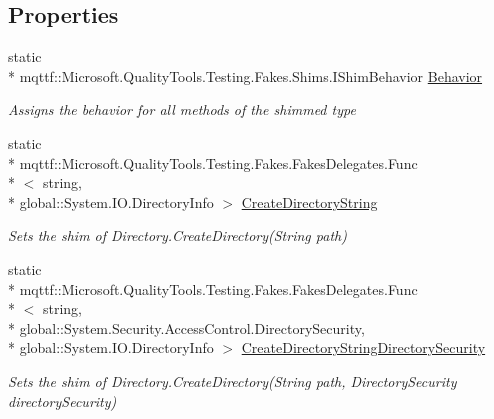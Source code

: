 \subsection*{Properties}
\begin{DoxyCompactItemize}
\item 
static \\*
mqttf\-::\-Microsoft.\-Quality\-Tools.\-Testing.\-Fakes.\-Shims.\-I\-Shim\-Behavior \hyperlink{class_system_1_1_i_o_1_1_fakes_1_1_shim_directory_a23cf83f8dd6e2bb5d536effd6df21480}{Behavior}
\begin{DoxyCompactList}\small\item\em Assigns the behavior for all methods of the shimmed type\end{DoxyCompactList}\item 
static \\*
mqttf\-::\-Microsoft.\-Quality\-Tools.\-Testing.\-Fakes.\-Fakes\-Delegates.\-Func\\*
$<$ string, \\*
global\-::\-System.\-I\-O.\-Directory\-Info $>$ \hyperlink{class_system_1_1_i_o_1_1_fakes_1_1_shim_directory_a897723efb5b5db0c15a1ec31423cb82b}{Create\-Directory\-String}
\begin{DoxyCompactList}\small\item\em Sets the shim of Directory.\-Create\-Directory(\-String path)\end{DoxyCompactList}\item 
static \\*
mqttf\-::\-Microsoft.\-Quality\-Tools.\-Testing.\-Fakes.\-Fakes\-Delegates.\-Func\\*
$<$ string, \\*
global\-::\-System.\-Security.\-Access\-Control.\-Directory\-Security, \\*
global\-::\-System.\-I\-O.\-Directory\-Info $>$ \hyperlink{class_system_1_1_i_o_1_1_fakes_1_1_shim_directory_aefb8ed4d675b858d14bc8ac03ebcca5d}{Create\-Directory\-String\-Directory\-Security}
\begin{DoxyCompactList}\small\item\em Sets the shim of Directory.\-Create\-Directory(\-String path, Directory\-Security directory\-Security)\end{DoxyCompactList}\item 

\end{DoxyCompactItemize}
